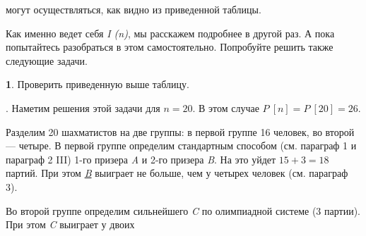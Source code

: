 \begin{paracol}{2}

{\renewcommand{\normalsize}{\fontsize{14}{16}\selectfont}
\normalsize
\noindent могут осуществляться, как видно из приведенной таблицы.

Как именно ведет себя \textit{I (n)}, мы расскажем подробнее в другой раз. А пока попытайтесь разобраться в этом самостоятельно. Попробуйте решить также следующие задачи.}

{\renewcommand{\normalsize}{\fontsize{10}{16}\selectfont}
\normalsize
\textbf{1}. Проверить приведенную выше таблицу.

. Наметим решения этой задачи для $n=20$. В этом случае $P \ [n]=P \ [20]=26$.

Разделим 20 шахматистов на две группы: в первой группе 16 человек, во второй --- четыре. В первой группе определим стандартным способом (см. параграф 1 и параграф 2 III) 1-го призера \textit{A} и 2-го призера \textit{B}. На это уйдет $15 + 3 = 18$ партий. При этом \textit{\underline{B}} выиграет не больше, чем у четырех человек (см. параграф 3).

Во второй группе определим сильнейшего \textit{C} по олимпиадной системе (3 партии). При этом \textit{C} выиграет у двоих


}
\end{paracol}
